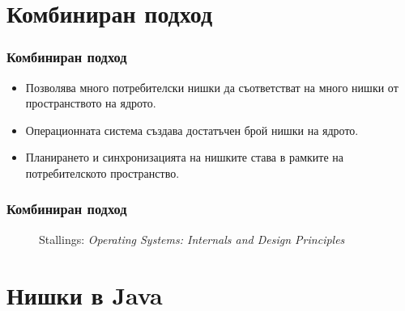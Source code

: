 \documentclass[ignorenonframetext, hyperref=unicode]{beamer}
\begin{document}
\section{Комбиниран подход}

\begin{frame}\frametitle{Комбиниран подход}
\begin{itemize}
\item Позволява много потребителски нишки да съответстват на много нишки от
пространството на ядрото.
\item Операционната система създава достатъчен брой нишки на ядрото.
\item Планирането и синхронизацията на нишките става в рамките на
потребителското пространство.
\end{itemize}
\end{frame}

\begin{frame}\frametitle{Комбиниран подход}
\begin{figure}[h]
\center
{}
\caption{Stallings: {\em Operating Systems: Internals and Design Principles}}
\end{figure}
\end{frame}


\section{Нишки в Java}
\end{document}
